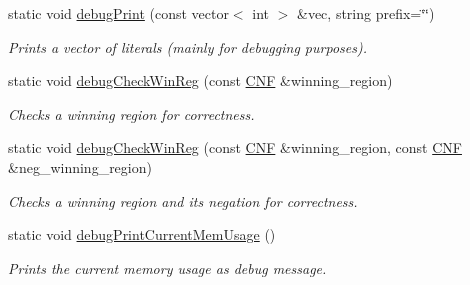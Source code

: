 \begin{DoxyCompactItemize}
static void \hyperlink{classUtils_adeaccd2a53073b17e3409eab8e98db0c}{debug\-Print} (const vector$<$ int $>$ \&vec, string prefix=\char`\"{}\char`\"{})
\begin{DoxyCompactList}\small\item\em Prints a vector of literals (mainly for debugging purposes). \end{DoxyCompactList}\item 
static void \hyperlink{classUtils_acc29602987b73022546a6d752a7e093f}{debug\-Check\-Win\-Reg} (const \hyperlink{classCNF}{C\-N\-F} \&winning\-\_\-region)
\begin{DoxyCompactList}\small\item\em Checks a winning region for correctness. \end{DoxyCompactList}\item 
static void \hyperlink{classUtils_a448f5356530d2e88fa9928f4ed857238}{debug\-Check\-Win\-Reg} (const \hyperlink{classCNF}{C\-N\-F} \&winning\-\_\-region, const \hyperlink{classCNF}{C\-N\-F} \&neg\-\_\-winning\-\_\-region)
\begin{DoxyCompactList}\small\item\em Checks a winning region and its negation for correctness. \end{DoxyCompactList}\item 
static void \hyperlink{classUtils_af69b7f70358d1c1616aab1560c7363cd}{debug\-Print\-Current\-Mem\-Usage} ()
\begin{DoxyCompactList}\small\item\em Prints the current memory usage as debug message. \end{DoxyCompactList}\end{DoxyCompactItemize}
